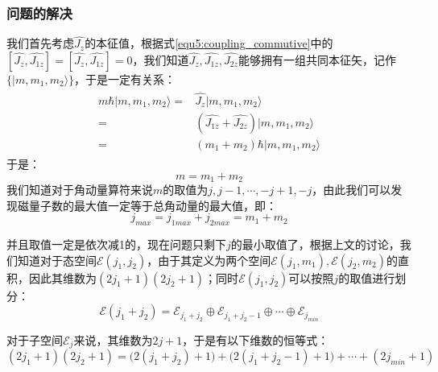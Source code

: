     \subsubsection{问题的解决}
    我们首先考虑$\hat{J_z}$的本征值，根据式\eqref{equ5:coupling_commutive}中的$ [\hat{J_z},\widehat{J_{1z}}]=[\hat{J_z},\widehat{J_{1z}}]=0$，我们知道$\hat{J_z},\widehat{J_{1z}},\widehat{J_{2z}}$能够拥有一组共同本征矢，记作$\{|m,m_1,m_2\rangle\}$，于是一定有关系：
    \begin{align}
    \begin{split}
         m\hbar|m,m_1,m_2\rangle=&\hat{J_z}|m,m_1,m_2\rangle\\
         =&(\widehat{J_{1z}}+\widehat{J_{2z}})|m,m_1,m_2\rangle\\
         =&(m_1+m_2)\hbar|m,m_1,m_2\rangle
    \end{split}
    \end{align}
    于是：
    \begin{equation}
        m=m_1+m_2
    \end{equation}
    我们知道对于角动量算符来说$m$的取值为$j,j-1,\cdots,-j+1,-j$，由此我们可以发现磁量子数的最大值一定等于总角动量的最大值，即：
    \begin{equation}
        j_{max}=j_{1max}+j_{2max}=m_1+m_2
    \end{equation}
    
    并且取值一定是依次减1的，现在问题只剩下$j$的最小取值了，根据上文的讨论，我们知道对于态空间$\mathcal{E}(j_1,j_2)$，由于其定义为两个空间$\mathcal{E}(j_1,m_1),\mathcal{E}(j_2,m_2)$的直积，因此其维数为$(2j_1+1)(2j_2+1)$；同时$\mathcal{E}(j_1,j_2)$可以按照$j$的取值进行划分：
    \begin{equation}
        \mathcal{E}(j_1+j_2)=\mathcal{E}_{j_1+j_2}\oplus\mathcal{E}_{j_1+j_2-1}\oplus\cdots \oplus \mathcal{E}_{j_{min}}
    \end{equation}
    
    对于子空间$\mathcal{E}_j$来说，其维数为$2j+1$，于是有以下维数的恒等式：
   \begin{equation}
        (2j_1+1)(2j_2+1)=\big(2(j_1+j_2)+1\big)+\big(2(j_1+j_2-1)+1\big)+\cdots +(2j_{min}+1)
   \end{equation}
    
